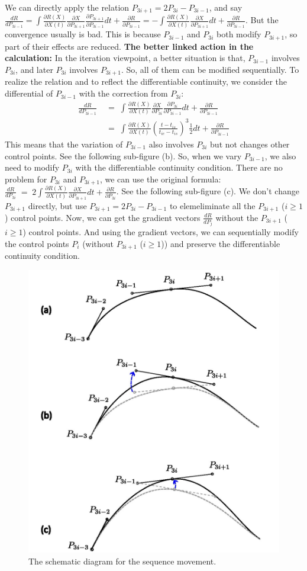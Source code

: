 \documentclass[12pt]{article}
\begin{document}
We can directly apply the relation $P_{3i+1} = 2P_{3i} - P_{3i-1}$, and say $\frac{d R}{d P_{3i-1}} = \int \frac{\partial R(X)}{\partial X(t)} \frac{\partial X}{\partial P_{3i+1}} \frac{\partial P_{3i+1}}{\partial P_{3i-1}} dt + \frac{\partial R}{\partial P_{3i-1}} = - \int \frac{\partial R(X)}{\partial X(t)} \frac{\partial X}{\partial P_{3i+1}} dt + \frac{\partial R}{\partial P_{3i-1}}$.
But the convergence usually is bad.
This is because $P_{3i-1}$ and $P_{3i}$ both modify $P_{3i+1}$, so part of their effects are reduced.
\textbf{The better linked action in the calculation:}
In the iteration viewpoint, a better situation is that, $P_{3i-1}$ involves $P_{3i}$, and later $P_{3i}$ involves $P_{3i+1}$.
So, all of them can be modified sequentially.
To realize the relation and to reflect the differentiable continuity, we consider the differential of $P_{3i-1}$ with the correction from $P_{3i}$:
%
\begin{align*}
	\frac{d R}{d P_{3i-1}} & \;=\; \int \frac{\partial R(X)}{\partial X(t)} \frac{\partial X}{\partial P_{3i}}\frac{\partial P_{3i}}{\partial P_{3i-1}} dt + \frac{\partial R}{\partial P_{3i-1}} \\
	& \;=\; \int \frac{\partial R(X)}{\partial X(t)} \left( \frac{t-t_{is}}{t_{ie}-t_{is}} \right)^3 \frac{1}{2} dt + \frac{\partial R}{\partial P_{3i-1}}
\end{align*}
%
This means that the variation of $P_{3i-1}$ also involves $P_{3i}$ but not changes other control points.
See the following sub-figure (b).
So, when we vary $P_{3i-1}$, we also need to modify $P_{3i}$ with the differentiable continuity condition.
There are no problem for $P_{3i}$ and $P_{3i+1}$, we can use the original formula: $\frac{d R}{d P_{3i}} \;=\; 2\int \frac{\partial R(X)}{\partial X(t)}\frac{\partial X}{\partial P_{3i+1}} dt + \frac{\partial R}{\partial P_{3i}}$.
See the following sub-figure (c).
We don't change $P_{3i+1}$ directly, but use $P_{3i+1} = 2P_{3i} - P_{3i-1}$ to elemeliminate all the $P_{3i+1}$ ($i\ge 1$) control points.
Now, we can get the gradient vectors $\frac{d R}{d P_j}$ without the $P_{3i+1}$ ($i\ge 1$) control points.
And using the gradient vectors, we can sequentially modify the control points $P_{i}$ (without $P_{3i+1}$ ($i\ge 1$)) and preserve the differentiable continuity condition.
%
\begin{figure}[H]
	\centering
	\includegraphics[width=0.5\linewidth]{move.jpg}
	\caption{The schematic diagram for the sequence movement.}
\end{figure}
\end{document}

